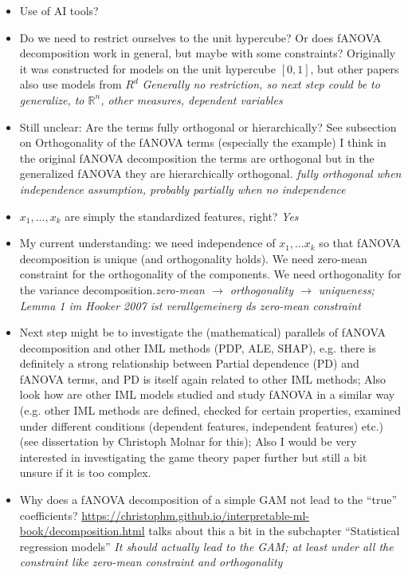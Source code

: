 \begin{itemize}
    \item Use of AI tools?
    \item Do we need to restrict ourselves to the unit hypercube? Or does fANOVA decomposition work in general, but maybe with some constraints? Originally it was constructed for models on the unit hypercube $[0,1]$, but other papers also use models from $R^d$ \textit{Generally no restriction, so next step could be to generalize, to $\mathbb{R}^n$, other measures, dependent variables}
    \item Still unclear: Are the terms fully orthogonal or hierarchically? See subsection on Orthogonality of the fANOVA terms (especially the example) I think in the original fANOVA decomposition the terms are orthogonal but in the generalized fANOVA \citep{hooker2007} they are hierarchically orthogonal. \textit{fully orthogonal when independence assumption, probably partially when no independence}
    \item $x_1, \dots, x_k$ are simply the standardized features, right? \textit{Yes}
    \item {\color{orange}My current understanding: we need independence of $x_1, \dots x_k$ so that fANOVA decomposition is unique (and orthogonality holds). We need zero-mean constraint for the orthogonality of the components. We need orthogonality for the variance decomposition.}\textit{zero-mean $\rightarrow$ orthogonality $\rightarrow$ uniqueness; Lemma 1 im Hooker 2007 ist verallgemeinerg ds zero-mean constraint}
    \item Next step might be to investigate the (mathematical) parallels of fANOVA decomposition and other IML methods (PDP, ALE, SHAP), e.g. there is definitely a strong relationship between Partial dependence (PD) and fANOVA terms, and PD is itself again related to other IML methods; Also look how are other IML models studied and study fANOVA in a similar way (e.g. other IML methods are defined, checked for certain properties, examined under different conditions (dependent features, independent features) etc.) (see dissertation by Christoph Molnar for this); Also I would be very interested in investigating the game theory paper further \citep{fumagalli2025} but still a bit unsure if it is too complex.
    \item Why does a fANOVA decomposition of a simple GAM not lead to the ``true'' coefficients? \href{https://christophm.github.io/interpretable-ml-book/decomposition.html}{https://christophm.github.io/interpretable-ml-book/decomposition.html} talks about this a bit in the subchapter ``Statistical regression models'' \textit{It should actually lead to the GAM; at least under all the constraint like zero-mean constraint and orthogonality}

\end{itemize}
